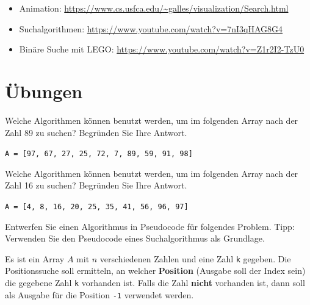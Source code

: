 \begin{itemize}
	\item Animation: \url{https://www.cs.usfca.edu/~galles/visualization/Search.html}
	\item Suchalgorithmen: \url{https://www.youtube.com/watch?v=7nI3qHAG8G4}
	\item Binäre Suche mit LEGO: \url{https://www.youtube.com/watch?v=Z1r2I2-TzU0}
\end{itemize}

\section{Übungen}

\begin{exercise}
Welche Algorithmen können benutzt werden, um im folgenden Array nach der Zahl \num{89} zu suchen? Begründen Sie Ihre Antwort.

\begin{center}
\lstinline[language=pseudocode]{A = [97, 67, 27, 25, 72, 7, 89, 59, 91, 98]}
\end{center}

\fillwithgrid{0.5in}

\end{exercise}

\begin{exercise}
Welche Algorithmen können benutzt werden, um im folgenden Array nach der Zahl \num{16} zu suchen? Begründen Sie Ihre Antwort.

\begin{center}
\lstinline[language=pseudocode]{A = [4, 8, 16, 20, 25, 35, 41, 56, 96, 97]}
\end{center}

\fillwithgrid{0.5in}

\end{exercise}

\begin{exercise}
Entwerfen Sie einen Algorithmus in Pseudocode für folgendes Problem. Tipp: Verwenden Sie den Pseudocode eines Suchalgorithmus als Grundlage.

\begin{problem}\label{problem-positionssuche-n-zahlen}
Es ist ein Array $A$ mit $n$ verschiedenen Zahlen und eine Zahl \lstinline[language=pseudocode]{k} gegeben. Die Positionssuche soll ermitteln, an welcher \textbf{Position} (Ausgabe soll der Index sein) die gegebene Zahl \lstinline[language=pseudocode]{k} vorhanden ist. Falls die Zahl \textbf{nicht} vorhanden ist, dann soll als Ausgabe für die Position \lstinline[language=pseudocode]{-1} verwendet werden.
\end{problem}


\end{exercise}

